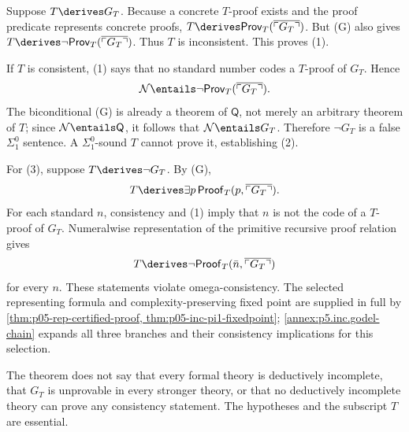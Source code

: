 \begin{proofplan}
Suppose \(T\derives G_T\).  Because a concrete \(T\)-proof exists and the
proof predicate represents concrete proofs,
\(T\derives\mathsf{Prov}_T(\overline{\ulcorner G_T\urcorner})\).  But (G)
also gives
\(T\derives\neg\mathsf{Prov}_T(\overline{\ulcorner G_T\urcorner})\).
Thus \(T\) is inconsistent.  This proves (1).

If \(T\) is consistent, (1) says that no standard number codes a
\(T\)-proof of \(G_T\).  Hence
\[
  \mathcal N\entails
  \neg\mathsf{Prov}_T(\overline{\ulcorner G_T\urcorner}).
\]
The biconditional (G) is already a theorem of \(\mathsf Q\), not merely an
arbitrary theorem of \(T\); since \(\mathcal N\entails\mathsf Q\), it follows
that \(\mathcal N\entails G_T\).
Therefore \(\neg G_T\) is a false \(\Sigma^0_1\) sentence.  A
\(\Sigma^0_1\)-sound \(T\) cannot prove it, establishing (2).

For (3), suppose \(T\derives\neg G_T\).  By (G),
\[
  T\derives\exists p\,
  \mathsf{Proof}_T(p,\overline{\ulcorner G_T\urcorner}).
\]
For each standard \(n\), consistency and (1) imply that \(n\) is not the code
of a \(T\)-proof of \(G_T\).  Numeralwise representation of the primitive
recursive proof relation gives
\[
  T\derives\neg
  \mathsf{Proof}_T(\bar n,\overline{\ulcorner G_T\urcorner})
\]
for every \(n\).  These statements violate omega-consistency.
The selected representing formula and complexity-preserving fixed point
are supplied in full by \cref{thm:p05-rep-certified-proof,
thm:p05-inc-pi1-fixedpoint}; \cref{annex:p5.inc.godel-chain} expands
all three branches and their consistency implications for this selection.
\end{proofplan}

\begin{warning}
The theorem does not say that every formal theory is deductively incomplete,
that \(G_T\) is unprovable in every stronger theory, or that no deductively
incomplete theory can prove any consistency statement.  The hypotheses and
the subscript \(T\) are essential.
\end{warning}
